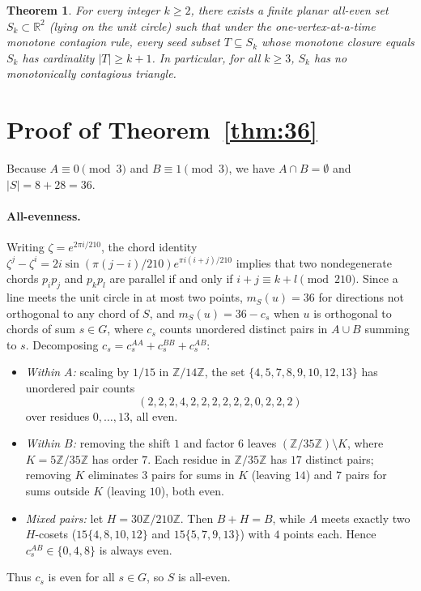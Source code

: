 \documentclass[11pt]{article}
\newtheorem{theorem}{Theorem}
\begin{document}
\begin{theorem}\label{thm:family}
For every integer $k \ge 2$, there exists a finite planar all-even set $S_k \subset \mathbb{R}^2$ (lying on the unit circle) such that under the one-vertex-at-a-time monotone contagion rule, every seed subset $T \subseteq S_k$ whose monotone closure equals $S_k$ has cardinality $|T| \ge k + 1$. In particular, for all $k \ge 3$, $S_k$ has no monotonically contagious triangle.
\end{theorem}

\section{Proof of Theorem~\ref{thm:36}}

Because $A \equiv 0 \pmod 3$ and $B \equiv 1 \pmod 3$, we have $A \cap B = \emptyset$ and $|S| = 8 + 28 = 36$.

\paragraph{All-evenness.}
Writing $\zeta = e^{2\pi i / 210}$, the chord identity $\zeta^j - \zeta^i = 2i\sin(\pi(j-i)/210)e^{\pi i(i+j)/210}$ implies that two nondegenerate chords $p_i p_j$ and $p_k p_l$ are parallel if and only if $i + j \equiv k + l \pmod{210}$. Since a line meets the unit circle in at most two points, $m_S(u) = 36$ for directions not orthogonal to any chord of $S$, and $m_S(u) = 36 - c_s$ when $u$ is orthogonal to chords of sum $s \in G$, where $c_s$ counts unordered distinct pairs in $A \cup B$ summing to $s$. Decomposing $c_s = c_s^{AA} + c_s^{BB} + c_s^{AB}$:
\begin{itemize}
\item \emph{Within $A$:} scaling by $1/15$ in $\mathbb{Z}/14\mathbb{Z}$, the set $\{4,5,7,8,9,10,12,13\}$ has unordered pair counts
\[(2, 2, 2, 4, 2, 2, 2, 2, 2, 2, 0, 2, 2, 2)\]
over residues $0,\dots,13$, all even.
\item \emph{Within $B$:} removing the shift $1$ and factor $6$ leaves $(\mathbb{Z}/35\mathbb{Z}) \setminus K$, where $K = 5\mathbb{Z}/35\mathbb{Z}$ has order $7$. Each residue in $\mathbb{Z}/35\mathbb{Z}$ has $17$ distinct pairs; removing $K$ eliminates $3$ pairs for sums in $K$ (leaving $14$) and $7$ pairs for sums outside $K$ (leaving $10$), both even.
\item \emph{Mixed pairs:} let $H = 30\mathbb{Z}/210\mathbb{Z}$. Then $B + H = B$, while $A$ meets exactly two $H$-cosets ($15\{4,8,10,12\}$ and $15\{5,7,9,13\}$) with $4$ points each. Hence $c_s^{AB} \in \{0, 4, 8\}$ is always even.
\end{itemize}
Thus $c_s$ is even for all $s \in G$, so $S$ is all-even.
\end{document}
